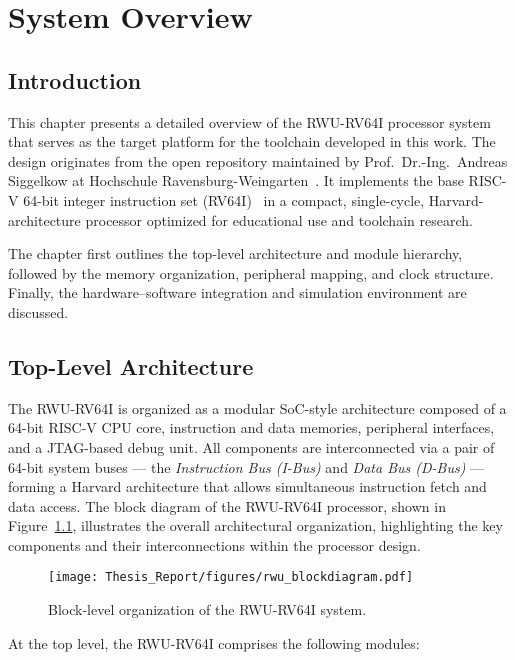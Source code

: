 \chapter{System Overview}
\label{ch:system}

\section{Introduction}
This chapter presents a detailed overview of the RWU-RV64I processor system that serves as the target platform for the toolchain developed in this work.  
The design originates from the open repository maintained by Prof.\ Dr.-Ing.\ Andreas Siggelkow at Hochschule Ravensburg-Weingarten~\cite{siggelkow-rwu-rv64i}.  
It implements the base RISC-V 64-bit integer instruction set (RV64I)~\cite{riscv-spec} in a compact, single-cycle, Harvard-architecture processor optimized for educational use and toolchain research.  

The chapter first outlines the top-level architecture and module hierarchy, followed by the memory organization, peripheral mapping, and clock structure.  
Finally, the hardware–software integration and simulation environment are discussed.

\section{Top-Level Architecture}
The RWU-RV64I is organized as a modular SoC-style architecture composed of a 64-bit RISC-V CPU core, instruction and data memories, peripheral interfaces, and a JTAG-based debug unit.  
All components are interconnected via a pair of 64-bit system buses — the \textit{Instruction Bus (I-Bus)} and \textit{Data Bus (D-Bus)} — forming a Harvard architecture that allows simultaneous instruction fetch and data access. The block diagram of the RWU-RV64I processor, shown in Figure~\ref{fig:rwu_blockdiagram}, illustrates the overall architectural organization, highlighting the key components and their interconnections within the processor design.

\begin{figure}[H]
  \centering
  \texttt{[image: Thesis\_Report/figures/rwu\_blockdiagram.pdf]}
  \caption{Block-level organization of the RWU-RV64I system.}
  \label{fig:rwu_blockdiagram}
\end{figure}

At the top level, the RWU-RV64I comprises the following modules:

